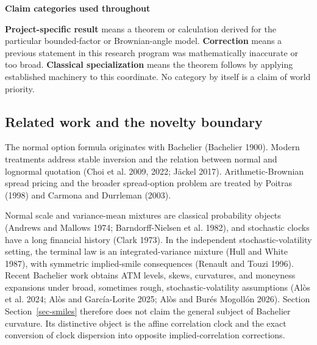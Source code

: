 \documentclass[
  english,
  11pt,
  letterpaper,
  DIV=11,
  numbers=noendperiod]{scrartcl}
\theoremstyle{plain}
\theoremstyle{plain}
\theoremstyle{plain}
\theoremstyle{plain}
\theoremstyle{remark}
\begin{document}
\begin{tcolorbox}[enhanced jigsaw, arc=.35mm, bottomrule=.15mm, breakable, colback=white, colframe=quarto-callout-note-color-frame, left=2mm, leftrule=.75mm, opacityback=0, rightrule=.15mm, toprule=.15mm]
\begin{minipage}[t]{5.5mm}
\textcolor{quarto-callout-note-color}{\faInfo}
\end{minipage}%
\begin{minipage}[t]{\textwidth - 5.5mm}

\vspace{-3mm}\textbf{Claim categories used throughout}\vspace{3mm}

\textbf{Project-specific result} means a theorem or calculation derived
for the particular bounded-factor or Brownian-angle model.
\textbf{Correction} means a previous statement in this research program
was mathematically inaccurate or too broad. \textbf{Classical
specialization} means the theorem follows by applying established
machinery to this coordinate. No category by itself is a claim of world
priority.

\end{minipage}%
\end{tcolorbox}

\subsection{Related work and the novelty
boundary}\label{related-work-and-the-novelty-boundary}

The normal option formula originates with Bachelier (Bachelier 1900).
Modern treatments address stable inversion and the relation between
normal and lognormal quotation (Choi et al. 2009, 2022; Jäckel 2017).
Arithmetic-Brownian spread pricing and the broader spread-option problem
are treated by Poitras (1998) and Carmona and Durrleman (2003).

Normal scale and variance-mean mixtures are classical probability
objects (Andrews and Mallows 1974; Barndorff-Nielsen et al. 1982), and
stochastic clocks have a long financial history (Clark 1973). In the
independent stochastic-volatility setting, the terminal law is an
integrated-variance mixture (Hull and White 1987), with symmetric
implied-smile consequences (Renault and Touzi 1996). Recent Bachelier
work obtains ATM levels, skews, curvatures, and moneyness expansions
under broad, sometimes rough, stochastic-volatility assumptions (Alòs et
al. 2024; Alòs and García-Lorite 2025; Alòs and Burés Mogollón 2026).
Section Section~\ref{sec-smiles} therefore does not claim the general
subject of Bachelier curvature. Its distinctive object is the affine
correlation clock and the exact conversion of clock dispersion into
opposite implied-correlation corrections.
\end{document}
